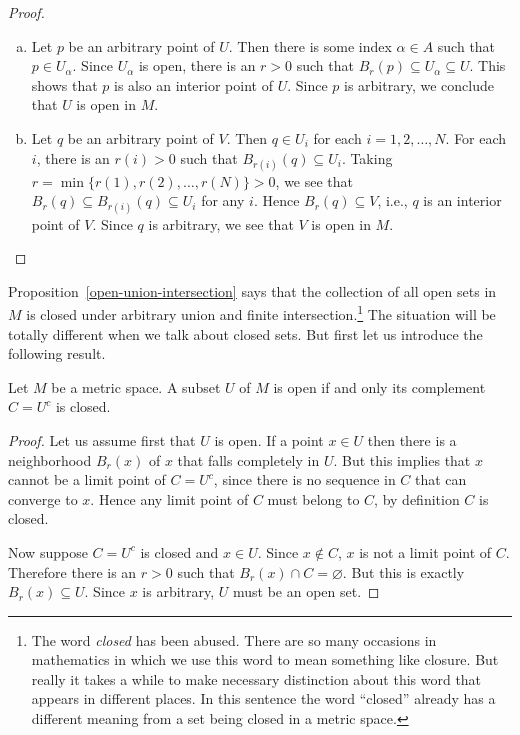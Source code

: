 \documentclass[11pt]{article}
\begin{document}
\begin{proof}
  \begin{enumerate}[(a)]
    \item Let $p$ be an arbitrary point of $U$.  Then there is some index $\alpha \in A$ such that $p \in U_\alpha$.
      Since $U_\alpha$ is open, there is an $r > 0$ such that $B_r(p) \subseteq U_\alpha \subseteq U$.
      This shows that $p$ is also an interior point of $U$.
      Since $p$ is arbitrary, we conclude that $U$ is open in $M$.

    \item Let $q$ be an arbitrary point of $V$.  Then $q \in U_i$ for each $i = 1, 2, \dots, N$.
      For each $i$, there is an $r(i) > 0$ such that $B_{r(i)}(q) \subseteq U_i$.
      Taking $r = \min \{ r(1), r(2), \dots, r(N) \} > 0$, we see that $B_r(q) \subseteq B_{r(i)}(q) \subseteq U_i$ for any $i$.
      Hence $B_r(q) \subseteq V$, i.e., $q$ is an interior point of $V$.
      Since $q$ is arbitrary, we see that $V$ is open in $M$.
  \end{enumerate}
\end{proof}

Proposition~\ref{open-union-intersection} says that the collection of all open sets in $M$ is closed under arbitrary union and finite intersection.\footnote{The word {\em closed} has been abused.  There are so many occasions in mathematics in which we use this word to mean something like closure.  But really it takes a while to make necessary distinction about this word that appears in different places.  In this sentence the word ``closed'' already has a different meaning from a set being closed in a metric space.}
The situation will be totally different when we talk about closed sets.
But first let us introduce the following result.

\begin{thm}
  \label{thm:open-closed}
  Let $M$ be a metric space.
  A subset $U$ of $M$ is open if and only its complement $C = U^c$ is closed.
\end{thm}

\begin{proof}
  Let us assume first that $U$ is open.
  If a point $x \in U$ then there is a neighborhood $B_r(x)$ of $x$ that falls completely in $U$.  But this implies that $x$ cannot be a limit point of $C = U^c$, since there is no sequence in $C$ that can converge to $x$.  Hence any limit point of $C$ must belong to $C$, by definition $C$ is closed.

  Now suppose $C = U^c$ is closed and $x \in U$.
  Since $x \notin C$, $x$ is not a limit point of $C$.
  Therefore there is an $r > 0$ such that $B_r(x) \cap C = \varnothing$.
  But this is exactly $B_r(x) \subseteq U$.
  Since $x$ is arbitrary, $U$ must be an open set.
\end{proof}
\end{document}
